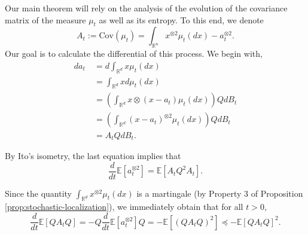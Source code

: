 \documentclass[12pt]{article}
\def \RR {\mathbb R}
\def \EE {\mathbb E}
\def \Cov {\mathrm {Cov}}
\def \Cov {\mathrm{Cov}}
\theoremstyle{definition}
\theoremstyle{remark}
\begin{document}
Our main theorem will rely on the analysis of the evolution of the covariance matrix of the measure $\mu_t$ as well as its entropy. To this end, we denote
$$
A_t := \Cov(\mu_t) = \int_{\RR^n} x ^{\otimes 2} \mu_t(dx) - a_t ^{\otimes 2}.
$$
Our goal is to calculate the differential of this process. We begin with,
\begin{align*}\label{eq:dat}
da_t ~& = d \int_{\RR^d} x \mu_t(dx)  \\
& = \int_{\RR^d} x d\mu_t(dx) \\
& = \left (\int_{\RR^d} x \otimes (x - a_t)\mu_t(dx) \right ) Q dB_t \\
& = \left (\int_{\RR^d} (x - a_t)^{\otimes 2} \mu_t(dx) \right ) Q dB_t \\ 
& = A_t Q dB_t.
\end{align*}

By Ito's isometry, the last equation implies that
$$
\frac{d}{dt} \EE \left [ a_t^{\otimes 2} \right ] = \EE [A_t Q^2 A_t].
$$

Since the quantity $\int_{\RR^d} x^{\otimes 2} \mu_t(dx)$ is a martingale (by Property 3 of Proposition \ref{prop:stochastic-localization}), we immediately obtain that for all $t>0$,
\begin{equation}\label{eq:dAt}
\frac{d}{dt} \EE \left [Q A_t Q \right ] = - Q \frac{d}{dt} \EE \left [ a_t^{\otimes 2} \right ] Q =  - \EE \left [ (Q A_t Q)^2 \right ] \preceq - \EE[QA_tQ]^2.
\end{equation}
\end{document}
